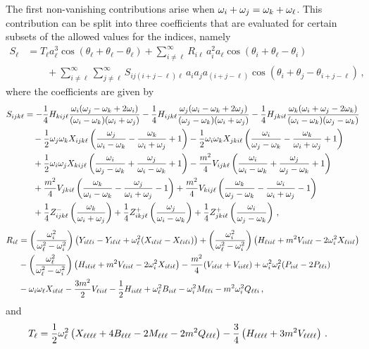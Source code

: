 \documentclass[../PhD.tex]{subfiles}
\newcommand{\thi}{\theta_i}
\newcommand{\thj}{\theta_j}
\newcommand{\thl}{\theta_\ell}
\begin{document}
The first non-vanishing contributions arise when $\omega_i + \omega_j = \omega_k + \omega_\ell$. This contribution can be split into three coefficients that are evaluated for certain subsets of the allowed values for the indices, namely
\begin{align}
S_\ell &= T_\ell a^3_\ell \cos (\thl + \thl - \thl) + \sum_{i \neq \ell}^\infty R_{i \ell} \, a^2_i a_\ell \cos(\thi + \thl - \thi) \nonumber \\
& \qquad + \sum_{i \neq \ell}^\infty \sum_{j \neq \ell}^\infty S_{i j (i + j - \ell) \ell} \, a_i a_j a_{(i + j - \ell)} \cos(\thi + \thj - \theta_{i + j -\ell} ) \, ,
\end{align}
where the coefficients are given by
\begin{align}
\label{S_ppm}
S_{ijk\ell} &= - \frac{1}{4} H_{kij\ell} \frac{\oi (\oj - \ok + 2\oi)}{(\oi - \ok)(\oi + \oj)} -\frac{1}{4} H_{ijk\ell} \frac{\oj (\oi - \ok + 2\oj)}{(\oj - \ok)(\oi + \oj)} - \frac{1}{4} H_{jki\ell} \frac{\ok ( \oi + \oj - 2\ok)}{(\oi - \ok)(\oj - \ok)} \nonumber \\
%
& \quad - \frac{1}{2} \oj \ok X_{ijk\ell} \left( \frac{\oj}{\oi - \ok} - \frac{\ok}{\oi + \oj} + 1 \right) - \frac{1}{2} \oi \ok X_{jki\ell} \left( \frac{\oi}{\oj - \ok} - \frac{\ok}{\oi + \oj} + 1 \right) \nonumber \\
%
& \quad + \frac{1}{2} \oi \oj X_{kij\ell} \left( \frac{\oi}{\oj - \ok} + \frac{\oj}{\oi - \ok} + 1 \right) - \frac{m^2}{4} V_{ijk\ell} \left( \frac{\oi}{\oi - \ok} + \frac{\oj}{\oj - \ok} + 1\right) \nonumber \\
%
& \quad + \frac{m^2}{4} V_{jki\ell} \left( \frac{\ok}{\oi - \ok} - \frac{\oj}{\oi + \oj} - 1 \right) + \frac{m^2}{4} V_{kij\ell} \left( \frac{\ok}{\oj - \ok} - \frac{\oi}{\oi + \oj} - 1 \right) \nonumber \\
%
& \quad + \frac{1}{4}  Z^-_{ijk\ell} \left( \frac{\ok}{\oi + \oj}\right)  + \frac{1}{4}  Z^+_{ikj\ell} \left( \frac{\oj}{\oi - \ok}\right) + \frac{1}{4} Z^+_{jki\ell} \left( \frac{\oi}{\oj - \ok} \right) \, ,
\end{align}
\begin{align}
\label{R_ppm}
R_{i\ell} &= \left(\frac{\oi^2}{\ol^2 - \oi^2} \right) \big( Y_{i\ell \ell i} - Y_{i\ell i \ell} + \ol^2 ( X_{i\ell i \ell} - X_{\ell i \ell i}) \big) + \left(\frac{\oi^2}{\ol^2 - \oi^2}\right) \big( H_{\ell i i\ell} + m^2 V_{ii\ell \ell} - 2\oi^2 X_{\ell i i \ell} \big) \nonumber \\
%
& - \left(\frac{\ol^2}{\ol^2 - \oi^2} \right) \big( H_{i\ell i \ell} + m^2 V_{\ell i i \ell} - 2\oi^2 X_{i\ell i\ell} \big) - \frac{m^2}{4}(V_{i\ell i \ell} + V_{ii\ell \ell} ) + \oi^2 \ol^2 (P_{ii\ell} - 2P_{\ell \ell i}) \nonumber \\
%
& - \oi\ol X_{i\ell i \ell} - \frac{3m^2}{2} V_{\ell ii \ell} - \frac{1}{2} H_{ii\ell \ell} + \ol^2 B_{ii\ell} - \oi^2 M_{\ell \ell i} - m^2 \oi^2 Q_{\ell \ell i} \, ,
\end{align}
and
\begin{align}
\label{T_ppm}
T_{\ell} &= \frac{1}{2} \omega_\ell^2 \left( X_{\ell \ell \ell \ell} + 4 B_{\ell \ell \ell} -2 M_{\ell \ell \ell} - 2m^2 Q_{\ell \ell \ell} \right) -\frac{3}{4} \left( H_{\ell \ell \ell \ell} + 3m^2 V_{\ell \ell \ell \ell} \right) \, .
\end{align}
\end{document}
